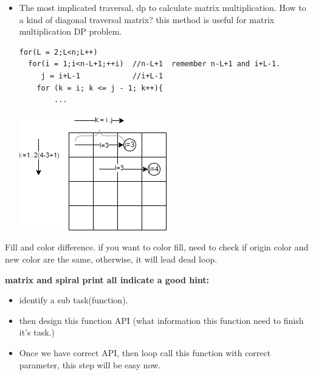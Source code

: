 \documentclass[a4paper,11pt,twoside]{book}
\begin{document}
\begin{itemize}
	
	
	\item The most implicated traversal, dp to calculate matrix multiplication. How to a kind of diagonal traversal matrix? this method is useful for matrix multiplication DP problem. 
	
\begin{lstlisting}
for(L = 2;L<n;L++)
  for(i = 1;i<n-L+1;++i)  //n-L+1  remember n-L+1 and i+L-1. 
     j = i+L-1            //i+L-1
  	for (k = i; k <= j - 1; k++){
  		...
\end{lstlisting}

\begin{center}
	\includegraphics[scale=0.60]{pics/transversal.drawio.png} 
\end{center}
	

\end{itemize}

	\par Fill and color difference. if you want to color fill, need to check if origin color and new color are the same, otherwise, it will lead dead loop. 
	

	
	\par \textbf{matrix and spiral print all indicate a good hint:} 
	
	\begin{itemize}
		\item identify a sub task(function).
		
		\item then design this function API (what information this function need to finish it's task.) 
		
		\item Once we have correct API, then loop call this function with correct parameter, this step will be easy now. 
	\end{itemize}
	
\end{document}
